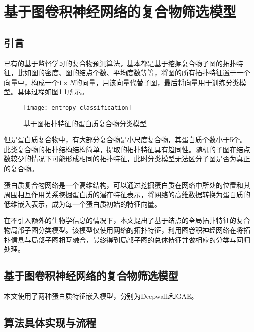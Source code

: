 \chapter{基于图卷积神经网络的复合物筛选模型}
\label{chapter:NodeConv}

\section{引言}
\label{section:NodeConv:Put}

已有的基于监督学习的复合物预测算法，基本都是基于挖掘复合物子图的拓扑特征，比如图的密度、图的结点个数、平均度数等等，将图的所有拓扑特征置于一个向量中，构成一个$1\times N$的向量，用该向量代替子图，最后将向量用于训练分类模型。具体过程如图\ref{fig:entropy-classification}所示。

\begin{figure}[htbp]
    \centering
    \texttt{[image: entropy-classification]}
    \caption{基于图拓扑特征的蛋白质复合物分类模型}
    \label{fig:entropy-classification}
\end{figure}


但是蛋白质复合物中，有大部分复合物是小尺度复合物，其蛋白质个数小于5个。此类复合物的拓扑结构结构简单，提取的拓扑特征具有趋同性。随机的子图在结点数较少的情况下可能形成相同的拓扑特征，此时分类模型无法区分子图是否为真正的复合物。

蛋白质复合物网络是一个高维结构，可以通过挖掘蛋白质在网络中所处的位置和其周围相互作用关系挖掘蛋白质的潜在特征表示，将网络的高维数据转换为蛋白质的低维嵌入表示，成为每一个蛋白质初始的特征向量。

在不引入额外的生物学信息的情况下，本文提出了基于结点的全局拓扑特征的复合物局部子图分类模型。该模型仅使用网络的拓扑特征，利用图卷积神经网络在将拓扑信息与局部子图相互融合，最终得到局部子图的总体特征并做相应的分类与回归处理。

\section{基于图卷积神经网络的复合物筛选模型}
\label{section:NodeConv:detail}

本文使用了两种蛋白质特征嵌入模型，分别为Deepwalk和GAE。





\section{算法具体实现与流程}
\label{section:NodeConv:flow}

